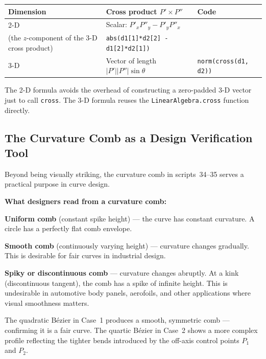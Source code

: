 \documentclass[12pt, a4paper]{article}
\newcommand{\cd}[1]{\texttt{#1}}
\begin{document}
\begin{center}
\begin{tabular}{p{2.5cm}p{5cm}p{4.5cm}}
\toprule
Dimension & Cross product $P' \times P''$ & Code \\
\midrule
2-D &
  Scalar: $P'_x P''_y - P'_y P''_x$\\
  (the $z$-component of the 3-D cross product) &
  \cd{abs(d1[1]*d2[2] - d1[2]*d2[1])} \\[6pt]
3-D &
  Vector of length $|P'||P''|\sin\theta$ &
  \cd{norm(cross(d1, d2))} \\
\bottomrule
\end{tabular}
\end{center}

The 2-D formula avoids the overhead of constructing a
zero-padded 3-D vector just to call \cd{cross}.
The 3-D formula reuses the \cd{LinearAlgebra.cross}
function directly.

\subsection{The Curvature Comb as a Design Verification Tool}

Beyond being visually striking, the curvature comb in
scripts~34--35 serves a practical purpose in curve design.

\begin{insightbox}
\textbf{What designers read from a curvature comb:}

\textbf{Uniform comb} (constant spike height) ---
the curve has constant curvature.
A circle has a perfectly flat comb envelope.

\textbf{Smooth comb} (continuously varying height) ---
curvature changes gradually.
This is desirable for fair curves in industrial design.

\textbf{Spiky or discontinuous comb} ---
curvature changes abruptly.
At a kink (discontinuous tangent), the comb has a
spike of infinite height.
This is undesirable in automotive body panels, aerofoils,
and other applications where visual smoothness matters.

The quadratic B\'ezier in Case~1 produces a smooth,
symmetric comb --- confirming it is a fair curve.
The quartic B\'ezier in Case~2 shows a more complex
profile reflecting the tighter bends introduced by the
off-axis control points $P_1$ and $P_2$.
\end{insightbox}


\end{document}
